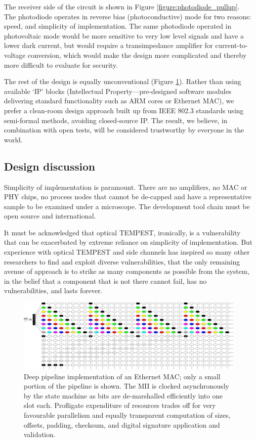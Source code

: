 \documentclass[conference]{IEEEtran}
\begin{document}
The receiver side of the circuit is shown in Figure
\ref{figure:photodiode_pullup}. The photodiode operates in reverse bias
(photoconductive) mode for two reasons: speed, and simplicity of
implementation. The same photodiode operated in photovoltaic mode would be
more sensitive to very low level signals and have a lower dark current, but
would require a transimpedance amplifier for current-to-voltage conversion,
which would make the design more complicated and thereby more difficult to
evaluate for security.

The rest of the design is equally unconventional (Figure
\ref{figure:deep_pipeline}). Rather than using available `IP' blocks
(Intellectual Property---pre-designed software modules delivering standard
functionality such as ARM cores or Ethernet MAC), we prefer a clean-room
design approach built up from IEEE 802.3 standards using semi-formal methods,
avoiding closed-source IP. The result, we believe, in combination with open
tests, will be considered trustworthy by everyone in the world.

\subsection{Design discussion}

Simplicity of implementation is paramount. There are no amplifiers, no MAC
or PHY chips, no process nodes that cannot be de-capped and have a
representative sample to be examined under a microscope. The development tool
chain must be open source and international.

It must be acknowledged that optical TEMPEST, ironically, is a vulnerability
that can be exacerbated by extreme reliance on simplicity of implementation.
But experience with optical TEMPEST and side channels has inspired so many
other researchers to find and exploit diverse vulnerabilities, that the only
remaining avenue of approach is to strike as many components as possible from
the system, in the belief that a component that is not there cannot fail, has
no vulnerabilities, and lasts forever.

\begin{figure}[!t]
    \centering
	\includegraphics[width=\textwidth]{graphics/deep_pipeline.png}
	\caption{Deep pipeline implementation of an Ethernet MAC; only a small
        portion of the pipeline is shown. The MII is clocked asynchronously
        by the state machine as bits are de-marshalled efficiently into one
        slot each. Profligate expenditure of resources trades off for very
        favourable parallelism and equally transparent computation of sizes,
        offsets, padding, checksum, and digital signature application and
        validation.}
	\label{figure:deep_pipeline}
\end{figure}
\end{document}
